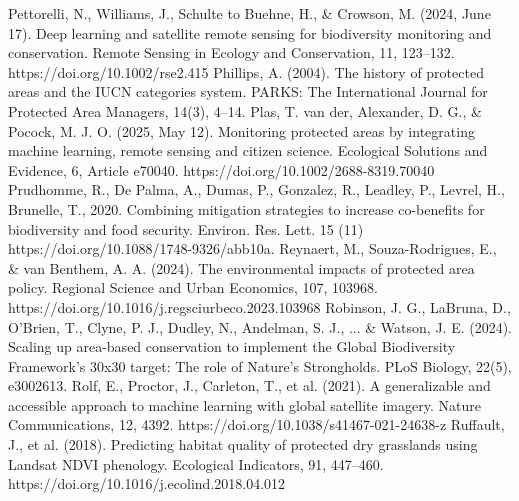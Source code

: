 \documentclass[12pt]{article}
\theoremstyle{break} %
\begin{document}
\newline \newline
Pettorelli, N., Williams, J., Schulte to Buehne, H., \& Crowson, M. (2024, June 17). Deep learning and satellite remote sensing for biodiversity monitoring and conservation. Remote Sensing in Ecology and Conservation, 11, 123–132. https://doi.org/10.1002/rse2.415
\newline \newline
Phillips, A. (2004). The history of protected areas and the IUCN categories system. PARKS: The International Journal for Protected Area Managers, 14(3), 4–14.
\newline \newline
Plas, T. van der, Alexander, D. G., \& Pocock, M. J. O. (2025, May 12). Monitoring protected areas by integrating machine learning, remote sensing and citizen science. Ecological Solutions and Evidence, 6, Article e70040. https://doi.org/10.1002/2688-8319.70040
\newline \newline
Prudhomme, R., De Palma, A., Dumas, P., Gonzalez, R., Leadley, P., Levrel, H., Brunelle, T., 2020. Combining mitigation strategies to increase co-benefits for biodiversity and food security. Environ. Res. Lett. 15 (11) https://doi.org/10.1088/1748-9326/abb10a. 
\newline \newline
Reynaert, M., Souza-Rodrigues, E., \& van Benthem, A. A. (2024). The environmental impacts of protected area policy. Regional Science and Urban Economics, 107, 103968. https://doi.org/10.1016/j.regsciurbeco.2023.103968
\newline \newline
Robinson, J. G., LaBruna, D., O’Brien, T., Clyne, P. J., Dudley, N., Andelman, S. J., ... \& Watson, J. E. (2024). Scaling up area-based conservation to implement the Global Biodiversity Framework’s 30x30 target: The role of Nature’s Strongholds. PLoS Biology, 22(5), e3002613.
\newline \newline
Rolf, E., Proctor, J., Carleton, T., et al. (2021). A generalizable and accessible approach to machine learning with global satellite imagery. Nature Communications, 12, 4392. https://doi.org/10.1038/s41467-021-24638-z
\newline \newline
Ruffault, J., et al. (2018). Predicting habitat quality of protected dry grasslands using Landsat NDVI phenology. Ecological Indicators, 91, 447–460. https://doi.org/10.1016/j.ecolind.2018.04.012
\end{document}
